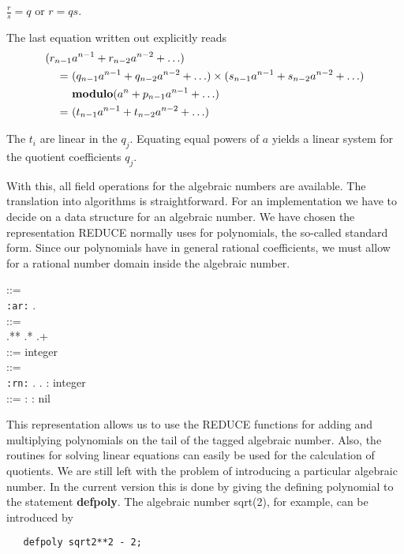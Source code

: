 $ \frac{r}{s} = q$ or $ r = q s $.

The last equation written out explicitly reads
\begin{align*}
  ({r_{n-1}} & {a^{n-1}} + {r_{n-2}} {a^{n-2}} + \ldots) \\
  =\ & ({q_{n-1}} {a^{n-1}} + {q_{n-2}} {a^{n-2}} + \ldots) \times
  ({s_{n-1}} {a^{n-1}} + {s_{n-2}} {a^{n-2}} + \ldots) \\
     & {\bf modulo} (a^n + {p _{n-1}} {a^{n -1}} + \ldots) \\
  =\ & ({t_{n-1}} {a^{n-1}} + {t_{n-2}} {a^{n-2}} + \ldots)
\end{align*}

The $t_i$ are linear in the $q_j$.  Equating equal powers of $a$ yields a
linear system for the quotient coefficients $q_j$.

With this, all field operations for the algebraic numbers are available.  The
translation into algorithms is straightforward.  For an implementation we
have to decide on a data structure for an algebraic number.  We have chosen
the representation REDUCE normally uses for polynomials, the so-called
standard form.  Since our polynomials have in general rational coefficients,
we must allow for a rational number domain inside the algebraic number.

\begin{flushleft}
 ::= \\
\hspace{.25in} {\tt :ar:} . 
\\[0.05in]

 ::= \\
\hspace{.25in}  .**  .*  .+  \\[0.05in]

 ::= integer \\[0.3in]

 ::= \\
\hspace{.25in} {\tt :rn:} .  .  :
integer \\[0.05in]

 ::=  :  : nil
\end{flushleft}

\hypertarget{operator:DEFPOLY}{}
This representation allows us to use the REDUCE functions for adding and
multiplying polynomials on the tail of the tagged algebraic number.  Also,
the routines for solving linear equations can easily be used for the
calculation of quotients.  We are still left with the problem of
introducing a particular algebraic number.  In the current version this is
done by giving the defining polynomial to the statement {\bf defpoly}.  The
algebraic number sqrt(2), for example, can be introduced by
\begin{verbatim}
   defpoly sqrt2**2 - 2;
\end{verbatim}

